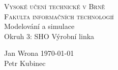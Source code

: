 \begin{titlepage}
\begin{center}
\textsc{{\LARGE Vysoké učení technické v Brně}\\
\smallskip
{\Large Fakulta informačních technologií}}\\
{\LARGE Modelování a simulace}\\
\medskip
{\Huge Okruh 3: SHO Výrobní linka}\\
\end{center}
{\Large Jan Wrona \hfill \today}\\
{\Large Petr Kubinec}
\end{titlepage}
